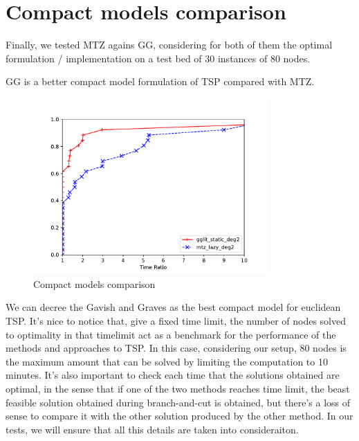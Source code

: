 \section{Compact models comparison}
Finally, we tested MTZ agains GG, considering for both of them the optimal
formulation / implementation on a test bed of 30 instances of 80 nodes.

\begin{claim} 
    GG is a better compact model formulation of TSP compared with MTZ.
\end{claim}

\begin{figure}[h]
    \centering
    \includegraphics[width=0.8\textwidth]{figures/compact_final}
    \caption{Compact models comparison}
\end{figure}

We can decree the Gavish and Graves as the best compact model for euclidean TSP.
It's nice to notice that, give a fixed time limit, the number of nodes solved to
optimality in that timelimit act as a benchmark for the performance of the
methods and approaches to TSP. In this case, considering our setup, 80 nodes is
the maximum amount that can be solved by limiting the computation to 10 minutes.
It's also important to check each time that the solutions obtained are optimal,
in the sense that if one of the two methods reaches time limit, the beast
feasible solution obtained during branch-and-cut is obtained, but there's a loss
of sense to compare it with the other solution produced by the other method. In
our tests, we will ensure that all this details are taken into consideraiton.
